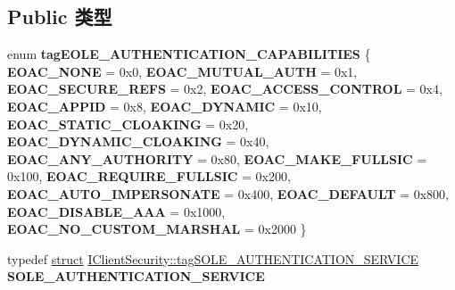 \subsection*{Public 类型}
\begin{DoxyCompactItemize}
\item 
\mbox{\label{interface_i_client_security_add86e0bf4eac5be037b0418ab5b6e4d0}} 
enum {\bfseries tag\+E\+O\+L\+E\+\_\+\+A\+U\+T\+H\+E\+N\+T\+I\+C\+A\+T\+I\+O\+N\+\_\+\+C\+A\+P\+A\+B\+I\+L\+I\+T\+I\+ES} \{ \newline
{\bfseries E\+O\+A\+C\+\_\+\+N\+O\+NE} = 0x0, 
{\bfseries E\+O\+A\+C\+\_\+\+M\+U\+T\+U\+A\+L\+\_\+\+A\+U\+TH} = 0x1, 
{\bfseries E\+O\+A\+C\+\_\+\+S\+E\+C\+U\+R\+E\+\_\+\+R\+E\+FS} = 0x2, 
{\bfseries E\+O\+A\+C\+\_\+\+A\+C\+C\+E\+S\+S\+\_\+\+C\+O\+N\+T\+R\+OL} = 0x4, 
\newline
{\bfseries E\+O\+A\+C\+\_\+\+A\+P\+P\+ID} = 0x8, 
{\bfseries E\+O\+A\+C\+\_\+\+D\+Y\+N\+A\+M\+IC} = 0x10, 
{\bfseries E\+O\+A\+C\+\_\+\+S\+T\+A\+T\+I\+C\+\_\+\+C\+L\+O\+A\+K\+I\+NG} = 0x20, 
{\bfseries E\+O\+A\+C\+\_\+\+D\+Y\+N\+A\+M\+I\+C\+\_\+\+C\+L\+O\+A\+K\+I\+NG} = 0x40, 
\newline
{\bfseries E\+O\+A\+C\+\_\+\+A\+N\+Y\+\_\+\+A\+U\+T\+H\+O\+R\+I\+TY} = 0x80, 
{\bfseries E\+O\+A\+C\+\_\+\+M\+A\+K\+E\+\_\+\+F\+U\+L\+L\+S\+IC} = 0x100, 
{\bfseries E\+O\+A\+C\+\_\+\+R\+E\+Q\+U\+I\+R\+E\+\_\+\+F\+U\+L\+L\+S\+IC} = 0x200, 
{\bfseries E\+O\+A\+C\+\_\+\+A\+U\+T\+O\+\_\+\+I\+M\+P\+E\+R\+S\+O\+N\+A\+TE} = 0x400, 
\newline
{\bfseries E\+O\+A\+C\+\_\+\+D\+E\+F\+A\+U\+LT} = 0x800, 
{\bfseries E\+O\+A\+C\+\_\+\+D\+I\+S\+A\+B\+L\+E\+\_\+\+A\+AA} = 0x1000, 
{\bfseries E\+O\+A\+C\+\_\+\+N\+O\+\_\+\+C\+U\+S\+T\+O\+M\+\_\+\+M\+A\+R\+S\+H\+AL} = 0x2000
 \}
\item 
\mbox{\label{interface_i_client_security_a190246da2485537cff7a6cfabb3d2ee6}} 
typedef \hyperlink{interfacestruct}{struct} \hyperlink{struct_i_client_security_1_1tag_s_o_l_e___a_u_t_h_e_n_t_i_c_a_t_i_o_n___s_e_r_v_i_c_e}{I\+Client\+Security\+::tag\+S\+O\+L\+E\+\_\+\+A\+U\+T\+H\+E\+N\+T\+I\+C\+A\+T\+I\+O\+N\+\_\+\+S\+E\+R\+V\+I\+CE} {\bfseries S\+O\+L\+E\+\_\+\+A\+U\+T\+H\+E\+N\+T\+I\+C\+A\+T\+I\+O\+N\+\_\+\+S\+E\+R\+V\+I\+CE}
\item 
\mbox{\label{interface_i_client_security_a049691065638a51f456e5fcce507b8eb}} 

\end{DoxyCompactItemize}
